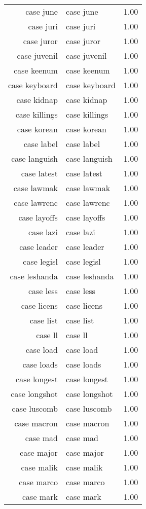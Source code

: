 \begin{table}[ht]
\begin{tabular}{rlr}
  case june & case june & 1.00 \\ 
  case juri & case juri & 1.00 \\ 
  case juror & case juror & 1.00 \\ 
  case juvenil & case juvenil & 1.00 \\ 
  case keenum & case keenum & 1.00 \\ 
  case keyboard & case keyboard & 1.00 \\ 
  case kidnap & case kidnap & 1.00 \\ 
  case killings & case killings & 1.00 \\ 
  case korean & case korean & 1.00 \\ 
  case label & case label & 1.00 \\ 
  case languish & case languish & 1.00 \\ 
  case latest & case latest & 1.00 \\ 
  case lawmak & case lawmak & 1.00 \\ 
  case lawrenc & case lawrenc & 1.00 \\ 
  case layoffs & case layoffs & 1.00 \\ 
  case lazi & case lazi & 1.00 \\ 
  case leader & case leader & 1.00 \\ 
  case legisl & case legisl & 1.00 \\ 
  case leshanda & case leshanda & 1.00 \\ 
  case less & case less & 1.00 \\ 
  case licens & case licens & 1.00 \\ 
  case list & case list & 1.00 \\ 
  case ll & case ll & 1.00 \\ 
  case load & case load & 1.00 \\ 
  case loads & case loads & 1.00 \\ 
  case longest & case longest & 1.00 \\ 
  case longshot & case longshot & 1.00 \\ 
  case luscomb & case luscomb & 1.00 \\ 
  case macron & case macron & 1.00 \\ 
  case mad & case mad & 1.00 \\ 
  case major & case major & 1.00 \\ 
  case malik & case malik & 1.00 \\ 
  case marco & case marco & 1.00 \\ 
  case mark & case mark & 1.00 \\ 

\end{tabular}
\end{table}
